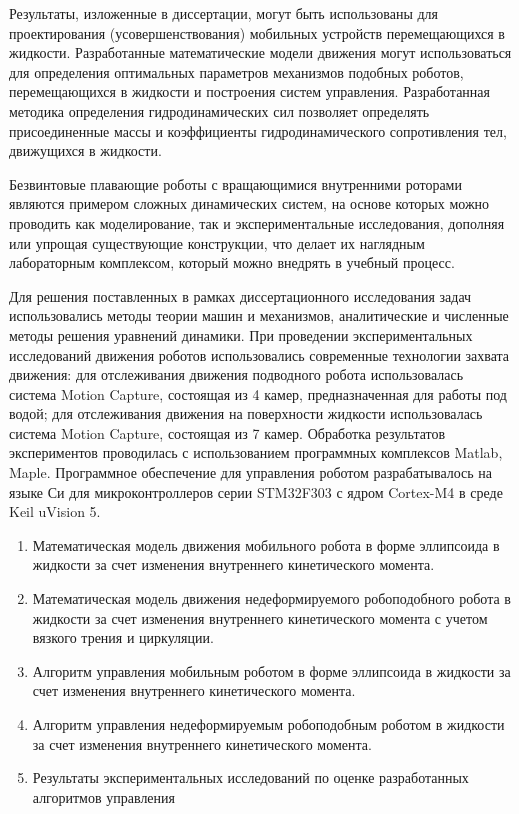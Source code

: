 {\influence} Результаты, изложенные в диссертации, могут быть использованы для проектирования (усовершенствования) мобильных устройств перемещающихся в жидкости. Разработанные математические модели движения могут использоваться для определения оптимальных параметров механизмов подобных роботов, перемещающихся в жидкости и построения систем управления. Разработанная методика определения гидродинамических сил позволяет определять присоединенные массы и коэффициенты гидродинамического сопротивления тел, движущихся в жидкости.

Безвинтовые плавающие роботы с вращающимися внутренними роторами являются примером сложных динамических систем, на основе которых можно проводить как моделирование, так и экспериментальные исследования, дополняя или упрощая существующие конструкции, что делает их наглядным лабораторным комплексом, который можно внедрять в учебный процесс.

{\methods} Для решения поставленных в рамках диссертационного исследования задач использовались методы теории машин и механизмов, аналитические и численные методы решения уравнений динамики. При проведении экспериментальных исследований движения роботов использовались современные технологии захвата движения: для отслеживания движения подводного робота использовалась система Motion Capture, состоящая из 4 камер, предназначенная для работы под водой; для отслеживания движения на поверхности жидкости использовалась система Motion Capture, состоящая из 7 камер. Обработка результатов экспериментов проводилась с использованием программных комплексов Matlab, Maple. Программное обеспечение для управления роботом разрабатывалось на языке Си для микроконтроллеров серии STM32F303 с ядром Cortex-M4 в среде Keil uVision 5.

{}
\begin{enumerate}
  \item Математическая модель движения мобильного робота в форме эллипсоида в жидкости за счет изменения внутреннего кинетического момента.
  \item Математическая модель движения недеформируемого робоподобного робота в жидкости за счет изменения внутреннего кинетического момента с учетом вязкого трения и циркуляции.
  \item Алгоритм управления мобильным роботом в форме эллипсоида в жидкости за счет изменения внутреннего кинетического момента.
  \item Алгоритм управления недеформируемым робоподобным роботом в жидкости за счет изменения внутреннего кинетического момента.
  \item Результаты экспериментальных исследований по оценке разработанных алгоритмов управления
  
\end{enumerate}

